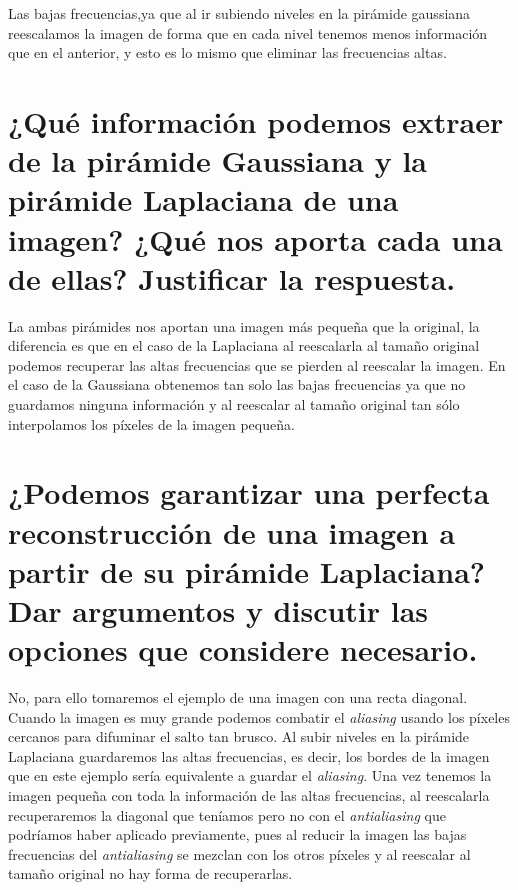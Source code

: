 \documentclass{article}
\begin{document}
Las bajas frecuencias,ya que al ir subiendo niveles en la pirámide gaussiana reescalamos la imagen de forma que en cada nivel tenemos menos información que en el anterior, y esto es lo mismo que eliminar las frecuencias altas.

\section{¿Qué información podemos extraer de la pirámide Gaussiana y la pirámide Laplaciana de una imagen? ¿Qué nos aporta cada una de ellas? Justificar la respuesta. }
La ambas pirámides nos aportan una imagen más pequeña que la original, la diferencia es que en el caso de la Laplaciana al reescalarla al tamaño original podemos recuperar las altas frecuencias que se pierden al reescalar la imagen. En el caso de la Gaussiana obtenemos tan solo las bajas frecuencias ya que no guardamos ninguna información y al reescalar al tamaño original tan sólo interpolamos los píxeles de la imagen pequeña.

\section{¿Podemos garantizar una perfecta reconstrucción de una imagen a partir de su pirámide Laplaciana? Dar argumentos y discutir las opciones que considere necesario.}
No, para ello tomaremos el ejemplo de una imagen con una recta diagonal. Cuando la imagen es muy grande podemos combatir el \textit{aliasing} usando los píxeles cercanos para difuminar el salto tan brusco. Al subir niveles en la pirámide Laplaciana guardaremos las altas frecuencias, es decir, los bordes de la imagen que en este ejemplo sería equivalente a guardar el \textit{aliasing}. Una vez tenemos la imagen pequeña con toda la información de las altas frecuencias, al reescalarla recuperaremos la diagonal que teníamos pero no con el \textit{antialiasing} que podríamos haber aplicado previamente, pues al reducir la imagen las bajas frecuencias del \textit{antialiasing} se mezclan con los otros píxeles y al reescalar al tamaño original no hay forma de recuperarlas.
\end{document}
